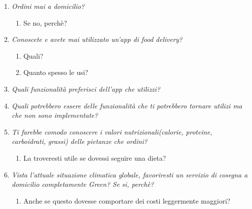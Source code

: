 \documentclass{article}
\begin{document}
    \begin{enumerate}
    
     \item \textit{Ordini mai a domicilio?}
        \begin{enumerate}
            \item Se no, perchè?
        \end{enumerate}
     \item \textit{Conoscete e avete mai utilizzato un'app di food delivery?}
     \begin{enumerate}
         \item Quali?
         \item Quanto spesso le usi?
     \end{enumerate}
     \item \textit{Quali funzionalità preferisci dell'app che utilizzi?}
     \item \textit{Quali potrebbero essere delle funzionalità che ti potrebbero tornare utilizi ma che non sono implementate?}
    \item \textit{Ti farebbe comodo conoscere i valori nutrizionali(calorie, proteine, carboidrati, grassi) delle pietanze che ordini?}
    \begin{enumerate}
        \item La troveresti utile se dovessi seguire una dieta?
    \end{enumerate}
    \item \textit{Vista l'attuale situazione climatica globale, favoriresti un servizio di cosegna a domicilio completamente Green? Se si, perchè? }
    \begin{enumerate}
        \item Anche se questo dovesse comportare dei costi leggermente maggiori?
    \end{enumerate}
\end{enumerate}

    \vspace{1cm}
 
\end{document}

